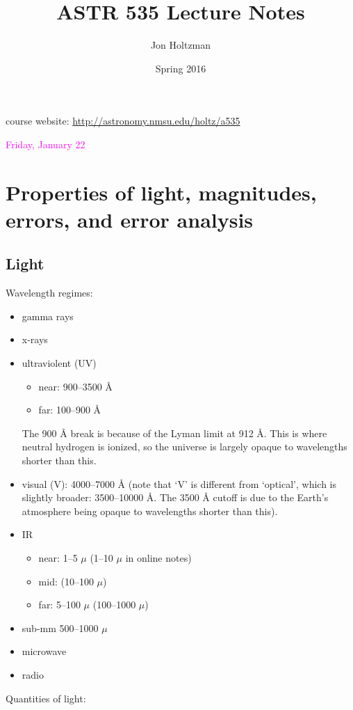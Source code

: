 \documentclass[12pt]{article}
\title{ASTR 535 Lecture Notes}
\author{Jon Holtzman}
\date{Spring 2016}
\begin{document}
\maketitle

course website: \textcolor{blue}
{\url{http://astronomy.nmsu.edu/holtz/a535}}

\textcolor{magenta}{Friday, January 22}
\section*{Properties of light, magnitudes, errors, and error analysis}

\subsection*{Light}
Wavelength regimes:
\begin{itemize}
    \item gamma rays
    \item x-rays
    \item ultraviolent (UV)
        \begin{itemize}
            \item near: 900--3500 \AA{}
            \item far: 100--900 \AA{}
        \end{itemize}
        The 900 \AA{} break is because of the Lyman limit at 912 \AA{}.
        This is where neutral hydrogen is ionized, so the universe is largely
        opaque to wavelengths shorter than this.
    \item visual (V): 4000--7000 \AA{}
    (note that `V' is different from `optical',
        which is slightly broader: 3500--10000 \AA{}. The 3500 \AA{} cutoff
        is due to the Earth's atmosphere being opaque to wavelengths shorter
        than this).
    \item IR
        \begin{itemize}
            \item near: 1--5 $\mu$ (1--10 $\mu$ in online notes)
            \item mid: (10--100 $\mu$)
            \item far: 5--100 $\mu$ (100--1000 $\mu$)
        \end{itemize}
    \item sub-mm 500--1000 $\mu$
    \item microwave
    \item radio
\end{itemize}
Quantities of light:
\end{document}
